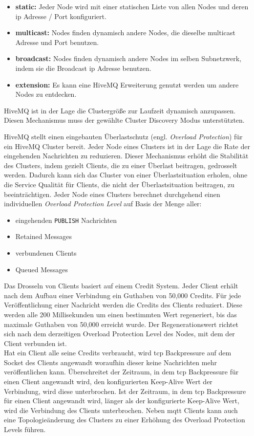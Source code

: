 \begin{itemize}
    \item \textbf{static:} Jeder Node wird mit einer statischen Liste von allen Nodes und deren \ac{ip} Adresse / Port konfiguriert.
    \item \textbf{multicast:} Nodes finden dynamisch andere Nodes, die dieselbe multicast Adresse und Port benutzen.
    \item \textbf{broadcast:} Nodes finden dynamisch andere Nodes im selben Subnetzwerk, indem sie die Broadcast \ac{ip} Adresse benutzen.
    \item \textbf{extension:} Es kann eine HiveMQ Erweiterung genutzt werden um andere Nodes zu entdecken.
\end{itemize}
HiveMQ ist in der Lage die Clustergrö{\ss}e zur Laufzeit dynamisch anzupassen. Diesen Mechanismus muss der gewählte Cluster Discovery Modus unterstützten.
\cite{HiveMQClusterHiveMQ}

 \label{sb:overload-protection}
HiveMQ stellt einen eingebauten Überlastschutz (engl. \textit{Overload Protection}) für ein HiveMQ Cluster bereit. Jeder Node eines Clusters ist in der Lage die Rate der eingehenden Nachrichten zu reduzieren. Dieser Mechanismus erhöht die Stabilität des Clusters, indem gezielt Clients, die zu einer Überlast beitragen, gedrosselt werden.
Dadurch kann sich das Cluster von einer Überlastsituation erholen, ohne die Service Qualität für Clients, die nicht der Überlastsituation beitragen, zu beeinträchtigen.
Jeder Node eines Clusters berechnet durchgehend einen individuellen \textit{Overload Protection Level} auf Basis der Menge aller:
\begin{itemize}
    \item eingehenden \verb|PUBLISH| Nachrichten
    \item Retained Messages
    \item verbundenen Clients
    \item Queued Messages
\end{itemize}
Das Drosseln von Clients basiert auf einem Credit System. Jeder Client erhält nach dem Aufbau einer Verbindung ein Guthaben von 50,000 Credits.
Für jede Veröffentlichung einer Nachricht werden die Credits des Clients reduziert.
Diese werden alle 200 Millisekunden um einen bestimmten Wert regeneriert, bis das maximale Guthaben von 50,000 erreicht wurde. Der Regenerationswert richtet sich nach dem derzeitigen Overload Protection Level des Nodes, mit dem der Client verbunden ist.
\\
Hat ein Client alle seine Credits verbraucht, wird \ac{tcp} Backpressure auf dem Socket des Clients angewandt woraufhin dieser keine Nachrichten mehr veröffentlichen kann.
Überschreitet der Zeitraum, in dem \ac{tcp} Backpressure für einen Client angewandt wird, den konfigurierten Keep-Alive Wert der Verbindung, wird diese unterbrochen.
Ist der Zeitraum, in dem \ac{tcp} Backpressure für einen Client angewandt wird, länger als der konfigurierte Keep-Alive Wert, wird die Verbindung des Clients unterbrochen.
Neben \ac{mqtt} Clients kann auch eine Topologieänderung des Clusters zu einer Erhöhung des Overload Protection Levels führen.
\cite{ClusterOverloadProtection}

